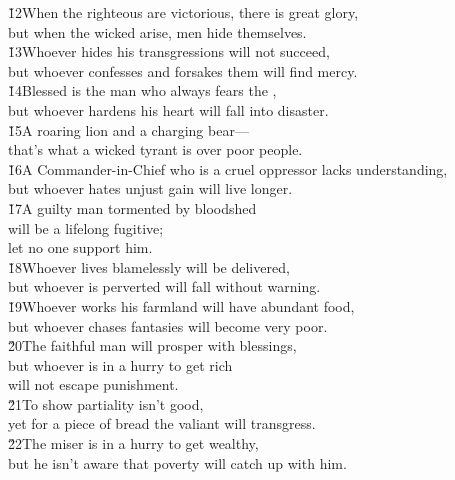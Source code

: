 \begin{poetry}
\poeml \v{12}When the righteous are victorious, there is great glory, \\
\poemll    but when the wicked arise, men hide themselves. \\
\poeml \v{13}Whoever hides his transgressions will not succeed, \\
\poemll    but whoever confesses and forsakes them will find mercy. \\
\poeml \v{14}Blessed is the man who always fears the , \\
\poemll    but whoever hardens his heart will fall into disaster. \\
\poeml \v{15}A roaring lion and a charging bear--- \\
\poemll    that's what a wicked tyrant is over poor people. \\
\poeml \v{16}A Commander-in-Chief who is a cruel oppressor lacks understanding, \\
\poemll    but whoever hates unjust gain will live longer. \\
\poeml \v{17}A guilty man tormented by bloodshed \\
\poemll    will be a lifelong fugitive; \\
\poemlll       let no one support him. \\
\poeml \v{18}Whoever lives blamelessly will be delivered, \\
\poemll    but whoever is perverted will fall without warning. \\
\poeml \v{19}Whoever works his farmland will have abundant food, \\
\poemll    but whoever chases fantasies will become very poor. \\
\poeml \v{20}The faithful man will prosper with blessings, \\
\poemll    but whoever is in a hurry to get rich \\
\poemlll       will not escape punishment. \\
\poeml \v{21}To show partiality isn't good, \\
\poemll    yet for a piece of bread the valiant will transgress. \\
\poeml \v{22}The miser is in a hurry to get wealthy, \\
\poemll    but he isn't aware that poverty will catch up with him. \\

\end{poetry}
